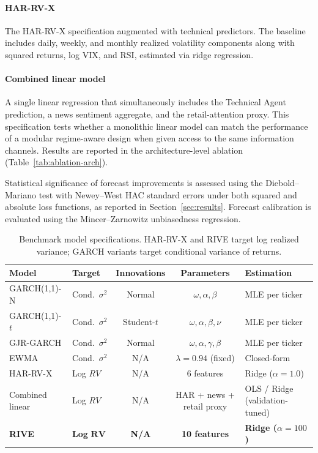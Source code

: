 \documentclass[review]{elsarticle}
\begin{document}
\paragraph{HAR-RV-X}
The HAR-RV-X specification \cite{corsi2009} augmented with technical predictors. The baseline includes daily, weekly, and monthly realized volatility components along with squared returns, log VIX, and RSI, estimated via ridge regression.

\paragraph{Combined linear model}
A single linear regression that simultaneously includes the Technical Agent prediction, a news sentiment aggregate, and the retail-attention proxy. %
This specification tests whether a monolithic linear model can match the performance of a modular regime-aware design when given access to the same information channels. Results are reported in the architecture-level ablation (Table~\ref{tab:ablation-arch}). %

Statistical significance of forecast improvements is assessed using the Diebold--Mariano test \cite{diebold1995} with Newey--West HAC standard errors \cite{newey1987} under both squared and absolute loss functions, as reported in Section~\ref{sec:results}. Forecast calibration is evaluated using the Mincer--Zarnowitz \cite{mincer1969} unbiasedness regression.

\begin{table}[t]
\centering
\caption{Benchmark model specifications. HAR-RV-X and RIVE target log realized variance; GARCH variants target conditional variance of returns.}
\label{tab:benchmark-specs}
\begin{tabular}{llccl}
\hline
Model & Target & Innovations & Parameters & Estimation \\
\hline
GARCH(1,1)-N & Cond.\ $\sigma^2$ & Normal & $\omega, \alpha, \beta$ & MLE per ticker \\
GARCH(1,1)-$t$ & Cond.\ $\sigma^2$ & Student-$t$ & $\omega, \alpha, \beta, \nu$ & MLE per ticker \\
GJR-GARCH & Cond.\ $\sigma^2$ & Normal & $\omega, \alpha, \gamma, \beta$ & MLE per ticker \\
EWMA & Cond.\ $\sigma^2$ & N/A & $\lambda = 0.94$ (fixed) & Closed-form \\
HAR-RV-X & Log $RV$ & N/A & 6 features & Ridge ($\alpha{=}1.0$) \\
Combined linear & Log $RV$ & N/A & HAR + news + retail proxy & OLS / Ridge (validation-tuned) \\
\textbf{RIVE} & \textbf{Log} $\boldsymbol{RV}$ & \textbf{N/A} & \textbf{10 features} & \textbf{Ridge ($\alpha{=}100$)} \\
\hline
\end{tabular}
\end{table}
\end{document}
